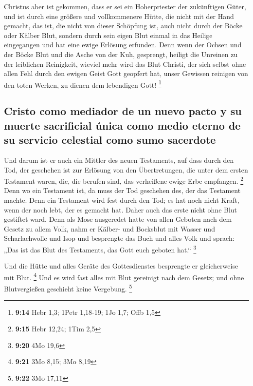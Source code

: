  Christus aber ist gekommen, dass er sei ein
Hoherpriester der zukünftigen Güter, und ist durch eine größere und
vollkommenere Hütte, die nicht mit der Hand gemacht, das ist, die nicht
von dieser Schöpfung ist,  auch nicht durch der Böcke
oder Kälber Blut, sondern durch sein eigen Blut einmal in das Heilige
eingegangen und hat eine ewige Erlösung erfunden.  Denn
wenn der Ochsen und der Böcke Blut und die Asche von der Kuh, gesprengt,
heiligt die Unreinen zu der leiblichen Reinigkeit, 
wieviel mehr wird das Blut Christi, der sich selbst ohne allen Fehl
durch den ewigen Geist Gott geopfert hat, unser Gewissen reinigen von
den toten Werken, zu dienen dem lebendigen Gott! \footnote{\textbf{9:14}
  Hebr 1,3; 1Petr 1,18-19; 1Jo 1,7; Offb 1,5}

\hypertarget{cristo-como-mediador-de-un-nuevo-pacto-y-su-muerte-sacrificial-uxfanica-como-medio-eterno-de-su-servicio-celestial-como-sumo-sacerdote}{%
\subsection{Cristo como mediador de un nuevo pacto y su muerte
sacrificial única como medio eterno de su servicio celestial como sumo
sacerdote}\label{cristo-como-mediador-de-un-nuevo-pacto-y-su-muerte-sacrificial-uxfanica-como-medio-eterno-de-su-servicio-celestial-como-sumo-sacerdote}}

 Und darum ist er auch ein Mittler des neuen Testaments,
auf dass durch den Tod, der geschehen ist zur Erlösung von den
Übertretungen, die unter dem ersten Testament waren, die, die berufen
sind, das verheißene ewige Erbe empfangen. \footnote{\textbf{9:15} Hebr
  12,24; 1Tim 2,5}  Denn wo ein Testament ist, da muss
der Tod geschehen des, der das Testament machte.  Denn
ein Testament wird fest durch den Tod; es hat noch nicht Kraft, wenn der
noch lebt, der es gemacht hat.  Daher auch das erste
nicht ohne Blut gestiftet ward.  Denn als Mose ausgeredet
hatte von allen Geboten nach dem Gesetz zu allem Volk, nahm er Kälber-
und Bocksblut mit Wasser und Scharlachwolle und Isop und besprengte das
Buch und alles Volk  und sprach: „Das ist das Blut des
Testaments, das Gott euch geboten hat.`` \footnote{\textbf{9:20} 4Mo
  19,6}

 Und die Hütte und alles Geräte des Gottesdienstes
besprengte er gleicherweise mit Blut. \footnote{\textbf{9:21} 3Mo 8,15;
  3Mo 8,19}  Und es wird fast alles mit Blut gereinigt
nach dem Gesetz; und ohne Blutvergießen geschieht keine Vergebung.
\footnote{\textbf{9:22} 3Mo 17,11}

